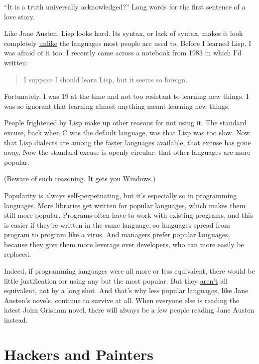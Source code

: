 \documentclass[12pt]{book}
\begin{document}
``It is a truth universally acknowledged?'' Long words for the first
sentence of a love story.

Like Jane Austen, Lisp looks hard. Its syntax, or lack of syntax, makes
it look completely
\href{https://sep.turbifycdn.com/ty/cdn/paulgraham/acl2.lisp?t=1688221954&}{unlike}
the languages most people are used to. Before I learned Lisp, I was
afraid of it too. I recently came across a notebook from 1983 in which
I'd written:

\begin{quote}
I suppose I should learn Lisp, but it seems so foreign.
\end{quote}

Fortunately, I was 19 at the time and not too resistant to learning new
things. I was so ignorant that learning almost anything meant learning
new things.

People frightened by Lisp make up other reasons for not using it. The
standard excuse, back when C was the default language, was that Lisp was
too slow. Now that Lisp dialects are among the
\href{http://shootout.alioth.debian.org/benchmark.php?test=nestedloop&lang=all&sort=cpu}{faster}
languages available, that excuse has gone away. Now the standard excuse
is openly circular: that other languages are more popular.

(Beware of such reasoning. It gets you Windows.)

Popularity is always self-perpetuating, but it's especially so in
programming languages. More libraries get written for popular languages,
which makes them still more popular. Programs often have to work with
existing programs, and this is easier if they're written in the same
language, so languages spread from program to program like a virus. And
managers prefer popular languages, because they give them more leverage
over developers, who can more easily be replaced.

Indeed, if programming languages were all more or less equivalent, there
would be little justification for using any but the most popular. But
they \href{icad.html}{aren't} all equivalent, not by a long shot. And
that's why less popular languages, like Jane Austen's novels, continue
to survive at all. When everyone else is reading the latest John Grisham
novel, there will always be a few people reading Jane Austen instead.
\chapter{Hackers and Painters}
\end{document}
